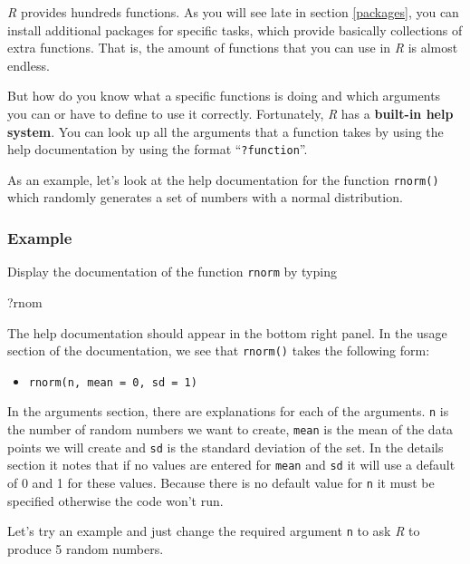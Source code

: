 \documentclass[
]{scrartcl}
\newenvironment{Shaded}{\begin{snugshade}}{\end{snugshade}}
\newcommand{\NormalTok}[1]{#1}
\providecommand{\tightlist}{%
  \setlength{\itemsep}{0pt}\setlength{\parskip}{0pt}}
\begin{document}
\emph{R} provides hundreds functions. As you will see late in section \ref{packages}, you can install additional packages for specific tasks, which provide basically collections of extra functions. That is, the amount of functions that you can use in \emph{R} is almost endless.

But how do you know what a specific functions is doing and which arguments you can or have to define to use it correctly. Fortunately, \emph{R} has a \textbf{built-in help system}. You can look up all the arguments that a function takes by using the help documentation by using the format ``\texttt{?function}''.

As an example, let's look at the help documentation for the function \texttt{rnorm()} which randomly generates a set of numbers with a normal distribution.

\subsubsection{Example}\label{examplernorm}

Display the documentation of the function \texttt{rnorm} by typing

\begin{Shaded}
\begin{Highlighting}[]
\NormalTok{?rnom}
\end{Highlighting}
\end{Shaded}

The help documentation should appear in the bottom right panel. In the usage section of the documentation, we see that \texttt{rnorm()} takes the following form:

\begin{itemize}
\tightlist
\item
  \texttt{rnorm(n,\ mean\ =\ 0,\ sd\ =\ 1)}
\end{itemize}

In the arguments section, there are explanations for each of the arguments. \texttt{n} is the number of random numbers we want to create, \texttt{mean} is the mean of the data points we will create and \texttt{sd} is the standard deviation of the set. In the details section it notes that if no values are entered for \texttt{mean} and \texttt{sd} it will use a default of 0 and 1 for these values. Because there is no default value for \texttt{n} it must be specified otherwise the code won't run.

Let's try an example and just change the required argument \texttt{n} to ask \emph{R} to produce 5 random numbers.
\end{document}
